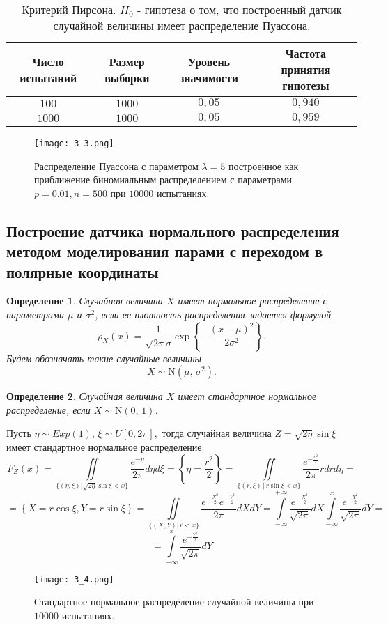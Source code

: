 \documentclass[a4paper, 11pt]{article}
\theoremstyle{def}
\newtheorem{definition}{Определение}[section]
\theoremstyle{th}
\theoremstyle{rem}
\begin{document}
\begin{table}[h]
\begin{center}
\begin{tabular}{|c|c|c|c|}
\hline
Число испытаний &
Размер выборки  &
Уровень значимости &
Частота принятия гипотезы
\\
\hline
$100$
&
$1000$
&
$0,05$
&
$0,940$
\\
\hline
$1000$
&
$1000$
&
$0,05$
&
$0,959$
\\
\hline
\end{tabular}
\end{center}
\caption{Критерий Пирсона. $H_0$ - гипотеза о том, что построенный датчик случайной величины имеет распределение Пуассона.}
\end{table}
\begin{figure}[H]
        \centering
        \texttt{[image: 3\_3.png]}
        \caption{Распределение Пуассона с параметром $\lambda = 5$ построенное как приближение биномиальным распределением с параметрами $p = 0.01, n = 500$ при $10000$ испытаниях.}
\end{figure}

\subsection{Построение датчика нормального распределения методом моделирования парами с переходом в полярные координаты}
\begin{definition}
        Случайная величина $X$ \textit{имеет нормальное распределение с параметрами $\mu$ и $\sigma^2$}, если ее плотность распределения задается формулой
$$
        \rho_X(x)
        =
        \frac{1}{\sqrt{2\pi}\sigma}
        \exp\left\{
                -\frac{(x - \mu)^2}{2\sigma^2}
        \right\}.
$$
        Будем обозначать такие случайные величины
$$
        X \sim \mbox{N}(\mu,\,\sigma^2).
$$
\end{definition}
\begin{definition}
    Случайная величина $X$ \textit{имеет стандартное нормальное распределение}, если $X \sim \mbox{N}(0,\,1)$.
\end{definition}
Пусть $\eta \sim Exp(1), \,\xi \sim U[0, 2\pi],$ тогда случайная величина $Z = \sqrt{2\eta}\sin{\xi}$ имеет стандартное нормальное распределение:
$$
F_Z(x) = \iint\limits_{\{(\eta, \xi)|\sqrt{2\eta}\sin{\xi}<x\}}\frac{e^{-\eta}}{2\pi}d\eta d\xi = \left\{\eta = \frac{r^2}{2}\right\} =\iint\limits_{\{(r, \xi)\,|\,r\sin{\xi}<x\}}\frac{e^{-\frac{r^2}{2}}}{2\pi}r drd\eta = $$
$$= \left\{X = r\cos{\xi}, Y = r\sin{\xi}\right\}
=\iint\limits_{\{(X, Y)|Y<x\}}\frac{e^{-\frac{X^2}{2}}e^{-\frac{Y^2}{2}}}{2\pi}dXdY =
\int\limits_{-\infty}^{+\infty}\frac{e^{-\frac{X^2}{2}}}{\sqrt{2\pi}}dX\int\limits_{-\infty}^x\frac{e^{-\frac{Y^2}{2}}}{\sqrt{2\pi}}dY = $$
$$= \int\limits_{-\infty}^x\frac{e^{-\frac{Y^2}{2}}}{\sqrt{2\pi}}dY
$$
\begin{figure}[h]
        \centering
        \texttt{[image: 3\_4.png]}
        \caption{Стандартное нормальное распределение случайной величины при $10000$ испытаниях.}
\end{figure}
\end{document}
